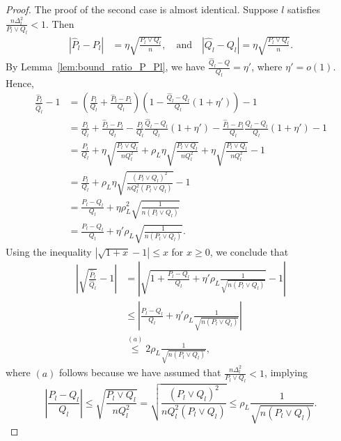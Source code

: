 \documentclass{article}
\begin{document}
\begin{proof}
The proof of the second case is almost identical. Suppose $l$ satisfies $\frac{n\Delta_l^2}{P_l \vee Q_l} < 1$. Then
\begin{align*}
| \hat{P}_l - P_l | &= \eta \sqrt{ \frac{P_l \vee Q_l}{n} }, \quad \text{and} \quad | \hat{Q}_l - Q_l | = \eta \sqrt{ \frac{P_l \vee Q_l}{n} }.
\end{align*}
By Lemma~\ref{lem:bound_ratio_P_Pl}, we have $\frac{\hat{Q}_l - Q}{Q_l} = \eta'$, where $\eta' = o(1)$.
Hence,
\begin{align*}
\frac{\hat{P}_l}{\hat{Q}_l} - 1 &= 
     \left( \frac{P_l}{Q_l} + \frac{\hat{P}_l - P_l}{Q_l} \right)
     \left( 1 - \frac{\hat{Q}_l - Q_l}{Q_l} ( 1 + \eta') \right) - 1 \\
 &= \frac{P_l}{Q_l} + \frac{\hat{P}_l - P_l}{Q_l} 
     - \frac{P_l}{Q_l} \frac{\hat{Q}_l - Q_l}{Q_l} (1 + \eta') 
     - \frac{\hat{P}_l - P_l}{Q_l} \frac{\hat{Q}_l - Q_l}{Q_l}(1+ \eta') 
   - 1  \\
&= \frac{P_l }{Q_l}  + \eta \sqrt{\frac{P_l \vee Q_l}{nQ_l^2}} + \rho_L \eta \sqrt{\frac{P_l \vee Q_l}{nQ_l^2}} + \eta \sqrt{\frac{P_l \vee Q_l}{nQ_l^2}} -1\\ 
%
&= \frac{P_l }{Q_l}  + \rho_L \eta \sqrt{\frac{(P_l \vee Q_l)^2}{nQ_l^2(P_l \vee Q_l)}} -1\\ 
%
&= \frac{P_l - Q_l}{Q_l}  + \eta \rho_L^2 \sqrt{\frac{1}{n(P_l \vee Q_l)}}\\
%
 &= \frac{P_l - Q_l}{Q_l} + \eta' \rho_L \sqrt{ \frac{1}{ n (P_l \vee Q_l)} } .
\end{align*}
Using the inequality $|\sqrt{1+x}-1| \leq x$ for $x \geq 0$, we conclude that
\begin{align*}
\left| \sqrt{ \frac{\hat{P}_l}{\hat{Q}_l} } - 1 \right| &= 
 \left|  \sqrt{ 1 + \frac{P_l - Q_l}{Q_l} + \eta' \rho_L \frac{1}{\sqrt{n (P_l \vee Q_l)} }}
   -1  \right| \\
  &\leq \left| \frac{P_l - Q_l}{Q_l} + \eta' \rho_L \frac{1}{\sqrt{ n (P_l \vee Q_l)}}    \right| \\
 &\stackrel{(a)} \leq 2 \rho_L \frac{1}{\sqrt{n (P_l \vee Q_l)} }, 
\end{align*}
where $(a)$ follows because we have assumed that $\frac{n\Delta_l^2}{P_l \vee Q_l} <1$, implying
$$ \left| \frac{P_l - Q_l}{Q_l} \right|\leq \sqrt{\frac{P_l \vee Q_l}{n Q_l^2}} =  \sqrt{\frac{(P_l \vee Q_l)^2}{n Q_l^2(P_l \vee Q_l)}} \leq \rho_L \frac{1}{\sqrt{n(P_l \vee Q_l)}}.$$
\end{proof}
\end{document}
